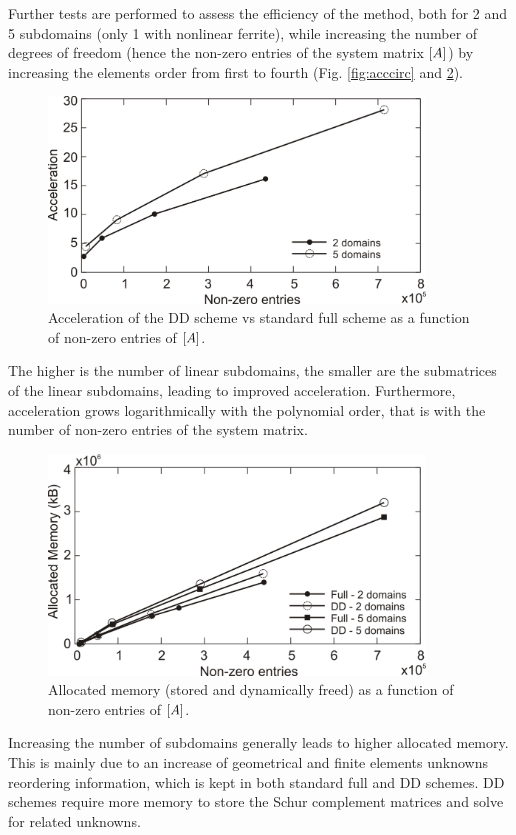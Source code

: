 Further tests are performed to assess the efficiency of the method, both for 2 and 5 subdomains (only 1 with
nonlinear ferrite), while increasing the number of degrees of freedom (hence the non-zero entries of the
system matrix $\left[A\right]$) by increasing the elements order from first to fourth (Fig. \ref{fig:acccirc} and \ref{fig:memcirc}).

\begin{figure}[!ht]
\centering
\includegraphics[width=10cm]{accelerationorder}
\caption{Acceleration of the DD scheme vs standard full scheme as a function of non-zero entries of $\left[A\right]$.}
\label{fig:accelerationorder}
\end{figure}

The higher is the number of linear subdomains, the smaller are the submatrices of the linear subdomains,
leading to improved acceleration. Furthermore, acceleration grows logarithmically with the polynomial
order, that is with the number of non-zero entries of the system matrix.

\begin{figure}[!ht]
\centering
\includegraphics[width=10cm]{memcirc}
\caption{Allocated memory (stored and dynamically freed) as a function of non-zero entries of $\left[A\right]$.}
\label{fig:memcirc}
\end{figure}

Increasing the number of subdomains generally leads to higher allocated memory. This is mainly due to an
increase of geometrical and finite elements unknowns reordering information, which is kept in both standard
full and DD schemes. DD schemes require more memory to store the Schur complement matrices and solve
for related unknowns.


